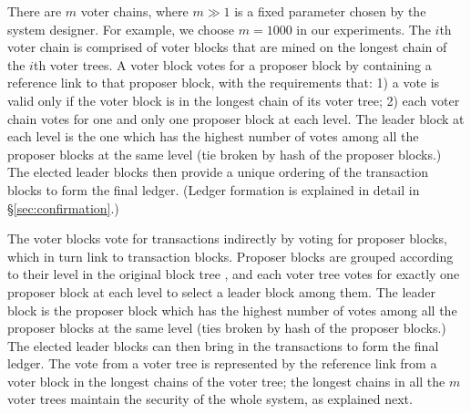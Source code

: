 There are $m$ voter chains, where $m \gg 1$ is a fixed parameter chosen by the system designer. For example, we choose $m=1000$ in our experiments.  The $i$th voter chain is comprised of voter blocks that are mined on the longest chain of the $i$th voter trees. A voter block votes for a proposer block by containing a reference link to that proposer block, with the requirements that: 1) a vote is valid only if the voter block is in the longest chain of its voter tree; 2) each voter chain votes for one and only one proposer block at each level. The leader block at each level is the one which has the highest number of votes among all the proposer blocks at the same level (tie broken by hash of the proposer blocks.) The elected leader blocks then provide a unique ordering of the transaction blocks to form the final ledger. (Ledger formation is explained in detail in \S\ref{sec:confirmation}.)







The voter blocks vote for transactions indirectly by voting for proposer blocks, which in turn link to transaction blocks. Proposer blocks are grouped according to their level in the original block tree , and each voter tree votes for exactly one proposer block at each level to select a leader block among them. The leader block is the proposer block which has the highest number of votes among all the proposer blocks at the same level (ties broken by hash of the proposer blocks.) The elected leader blocks can then bring in the transactions to form the final ledger.  The vote from a voter tree is represented by the reference link from a voter block in the longest chains of the voter tree; the longest chains in all the $m$ voter trees maintain the security of the whole system, as explained next.

